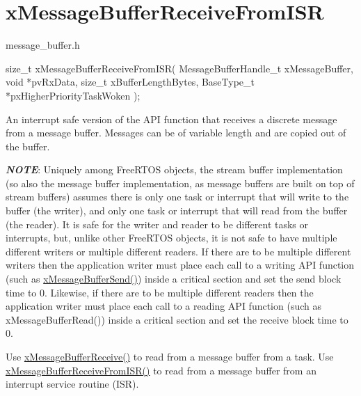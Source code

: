 \hypertarget{group__xMessageBufferReceiveFromISR}{}\section{x\+Message\+Buffer\+Receive\+From\+I\+SR}
\label{group__xMessageBufferReceiveFromISR}
message\+\_\+buffer.\+h


\begin{DoxyPre}
size\_t xMessageBufferReceiveFromISR( MessageBufferHandle\_t xMessageBuffer,
                                     void *pvRxData,
                                     size\_t xBufferLengthBytes,
                                     BaseType\_t *pxHigherPriorityTaskWoken );
\end{DoxyPre}


An interrupt safe version of the A\+PI function that receives a discrete message from a message buffer. Messages can be of variable length and are copied out of the buffer.

{\itshape {\bfseries N\+O\+TE}}\+: Uniquely among Free\+R\+T\+OS objects, the stream buffer implementation (so also the message buffer implementation, as message buffers are built on top of stream buffers) assumes there is only one task or interrupt that will write to the buffer (the writer), and only one task or interrupt that will read from the buffer (the reader). It is safe for the writer and reader to be different tasks or interrupts, but, unlike other Free\+R\+T\+OS objects, it is not safe to have multiple different writers or multiple different readers. If there are to be multiple different writers then the application writer must place each call to a writing A\+PI function (such as \hyperlink{message__buffer_8h_a858f6da6fe24a226c45caf1634ea1605}{x\+Message\+Buffer\+Send()}) inside a critical section and set the send block time to 0. Likewise, if there are to be multiple different readers then the application writer must place each call to a reading A\+PI function (such as x\+Message\+Buffer\+Read()) inside a critical section and set the receive block time to 0.

Use \hyperlink{message__buffer_8h_af12a227ba511a95cbea5aa81c7f3ba12}{x\+Message\+Buffer\+Receive()} to read from a message buffer from a task. Use \hyperlink{message__buffer_8h_adf596c00c44752a3c8c542cc6b5df234}{x\+Message\+Buffer\+Receive\+From\+I\+S\+R()} to read from a message buffer from an interrupt service routine (I\+SR).


